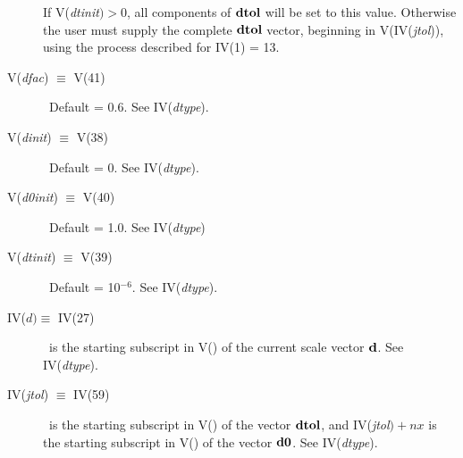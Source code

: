 \documentclass[twoside]{MATH77}
\begin{document}
\begin{description}
If V({\em dtinit}$)>0$, all components of ${\bf dtol}$ will be set to this value.
Otherwise the user must supply the complete ${\bf dtol}$ vector, beginning in
V(IV({\em jtol})), using the process described for IV(1) = 13.

\item[V({\em dfac}) $\equiv $ V(41)]  \ Default = 0.6. See IV({\em dtype}).

\item[V({\em dinit}) $\equiv $ V(38)]  \ Default = 0. See IV({\em dtype}).

\item[V({\em d0init}) $\equiv $ V(40)]  \ Default = 1.0. See IV({\em dtype})

\item[V({\em dtinit}) $\equiv $ V(39)]  \ Default = 10$^{-6}$. See IV({\em dtype}).

\item[IV($d) \equiv $ IV(27)]  \ is the starting subscript in V() of the
current scale vector ${\bf d}$. See IV({\em dtype}).

\item[IV({\em jtol}) $\equiv $ IV(59)]  \ is the starting subscript in V() of the
vector ${\bf dtol}$, and IV({\em jtol}$)+nx$ is the starting subscript in V() of the
vector ${\bf d0}$. See IV({\em dtype}).
\end{description}
\end{document}
